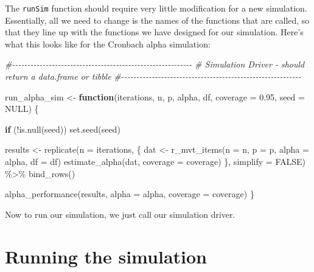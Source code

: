 \documentclass[
]{book}
\newenvironment{Shaded}{\begin{snugshade}}{\end{snugshade}}
\newcommand{\AttributeTok}[1]{\textcolor[rgb]{0.77,0.63,0.00}{#1}}
\newcommand{\CommentTok}[1]{\textcolor[rgb]{0.56,0.35,0.01}{\textit{#1}}}
\newcommand{\ConstantTok}[1]{\textcolor[rgb]{0.00,0.00,0.00}{#1}}
\newcommand{\ControlFlowTok}[1]{\textcolor[rgb]{0.13,0.29,0.53}{\textbf{#1}}}
\newcommand{\FloatTok}[1]{\textcolor[rgb]{0.00,0.00,0.81}{#1}}
\newcommand{\FunctionTok}[1]{\textcolor[rgb]{0.00,0.00,0.00}{#1}}
\newcommand{\NormalTok}[1]{#1}
\newcommand{\OtherTok}[1]{\textcolor[rgb]{0.56,0.35,0.01}{#1}}
\newcommand{\SpecialCharTok}[1]{\textcolor[rgb]{0.00,0.00,0.00}{#1}}
\begin{document}
The \texttt{runSim} function should require very little modification for a new simulation. Essentially, all we need to change is the names of the functions that are called, so that they line up with the functions we have designed for our simulation. Here's what this looks like for the Cronbach alpha simulation:

\begin{Shaded}
\begin{Highlighting}[]
\CommentTok{\#{-}{-}{-}{-}{-}{-}{-}{-}{-}{-}{-}{-}{-}{-}{-}{-}{-}{-}{-}{-}{-}{-}{-}{-}{-}{-}{-}{-}{-}{-}{-}{-}{-}{-}{-}{-}{-}{-}{-}{-}{-}{-}{-}{-}{-}{-}{-}{-}{-}{-}{-}{-}{-}{-}{-}{-}{-}{-}{-}}
\CommentTok{\# Simulation Driver {-} should return a data.frame or tibble}
\CommentTok{\#{-}{-}{-}{-}{-}{-}{-}{-}{-}{-}{-}{-}{-}{-}{-}{-}{-}{-}{-}{-}{-}{-}{-}{-}{-}{-}{-}{-}{-}{-}{-}{-}{-}{-}{-}{-}{-}{-}{-}{-}{-}{-}{-}{-}{-}{-}{-}{-}{-}{-}{-}{-}{-}{-}{-}{-}{-}{-}{-}}

\NormalTok{run\_alpha\_sim }\OtherTok{\textless{}{-}} \ControlFlowTok{function}\NormalTok{(iterations, n, p, alpha, df, }\AttributeTok{coverage =} \FloatTok{0.95}\NormalTok{, }\AttributeTok{seed =} \ConstantTok{NULL}\NormalTok{) \{}
  
  \ControlFlowTok{if}\NormalTok{ (}\SpecialCharTok{!}\FunctionTok{is.null}\NormalTok{(seed)) }\FunctionTok{set.seed}\NormalTok{(seed)}

\NormalTok{  results }\OtherTok{\textless{}{-}} 
    \FunctionTok{replicate}\NormalTok{(}\AttributeTok{n =}\NormalTok{ iterations, \{}
\NormalTok{      dat }\OtherTok{\textless{}{-}} \FunctionTok{r\_mvt\_items}\NormalTok{(}\AttributeTok{n =}\NormalTok{ n, }\AttributeTok{p =}\NormalTok{ p, }\AttributeTok{alpha =}\NormalTok{ alpha, }\AttributeTok{df =}\NormalTok{ df)}
      \FunctionTok{estimate\_alpha}\NormalTok{(dat, }\AttributeTok{coverage =}\NormalTok{ coverage)}
\NormalTok{    \}, }\AttributeTok{simplify =} \ConstantTok{FALSE}\NormalTok{) }\SpecialCharTok{\%\textgreater{}\%}
    \FunctionTok{bind\_rows}\NormalTok{()}
  
  \FunctionTok{alpha\_performance}\NormalTok{(results, }\AttributeTok{alpha =}\NormalTok{ alpha, }\AttributeTok{coverage =}\NormalTok{ coverage)}
\NormalTok{\}}
\end{Highlighting}
\end{Shaded}

Now to run our simulation, we just call our simulation driver.

\hypertarget{running-the-simulation}{%
\section{Running the simulation}\label{running-the-simulation}}
\end{document}
